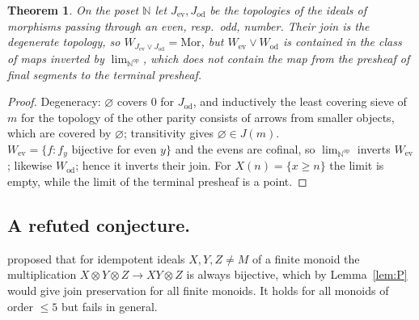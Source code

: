 \documentclass[11pt]{amsart}
\newtheorem{thm}{Theorem}[section]
\theoremstyle{definition}
\newcommand{\Mor}{\mathrm{Mor}}
\begin{document}
\begin{thm}\label{thm:N}
On the poset $\mathbb N$ let $J_{\mathrm{ev}},J_{\mathrm{od}}$ be the topologies
of the ideals of morphisms passing through an even, resp.\ odd, number. Their
join is the degenerate topology, so $W_{J_{\mathrm{ev}}\vee J_{\mathrm{od}}}=\Mor$,
but $W_{\mathrm{ev}}\vee W_{\mathrm{od}}$ is contained in the class of maps
inverted by $\lim_{\mathbb N^{\mathrm{op}}}$, which does not contain the map from
the presheaf of final segments to the terminal presheaf.
\end{thm}
\begin{proof}
Degeneracy: $\varnothing$ covers $0$ for $J_{\mathrm{od}}$, and inductively the
least covering sieve of $m$ for the topology of the other parity consists of
arrows from smaller objects, which are covered by $\varnothing$; transitivity
gives $\varnothing\in J(m)$. $W_{\mathrm{ev}}=\{f:f_y\text{ bijective for even }y\}$
and the evens are cofinal, so $\lim_{\mathbb N^{\mathrm{op}}}$ inverts
$W_{\mathrm{ev}}$; likewise $W_{\mathrm{od}}$; hence it inverts their join. For
$X(n)=\{x\ge n\}$ the limit is empty, while the limit of the terminal presheaf
is a point.
\end{proof}

\subsection{A refuted conjecture.}
\cite[Conj.~6.12]{Topjoin} proposed that for idempotent ideals $X,Y,Z\ne M$ of a
finite monoid the multiplication $X\otimes Y\otimes Z\to XY\otimes Z$ is always
bijective, which by Lemma~\ref{lem:P} would give join preservation for all
finite monoids. It holds for all monoids of order $\le5$ but fails in general.
\end{document}
